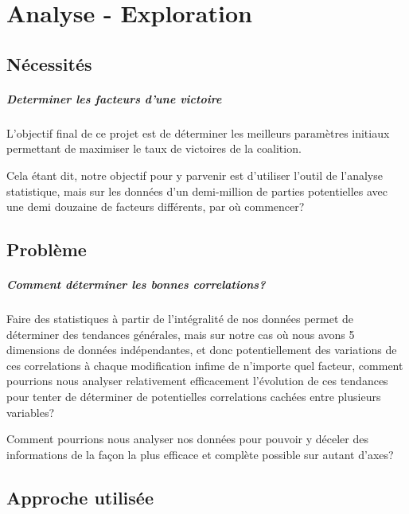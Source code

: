 \chapter{Analyse - Exploration}

	\section{Nécessités}
	
		\paragraph{Determiner les facteurs d'une victoire}
		L'objectif final de ce projet est de déterminer les meilleurs paramètres initiaux permettant de maximiser le taux de victoires de la coalition.
		
		Cela étant dit, notre objectif pour y parvenir est d'utiliser l'outil de l'analyse statistique, mais sur les données d'un demi-million de parties potentielles avec une demi douzaine de facteurs différents, par où commencer?
 
	
	\section{Problème}
		
		\paragraph{Comment déterminer les bonnes correlations?}
		Faire des statistiques à partir de l'intégralité de nos données permet de déterminer des tendances générales, mais sur notre cas où nous avons 5 dimensions de données indépendantes, et donc potentiellement des variations de ces correlations à chaque modification infime de n'importe quel facteur, comment pourrions nous analyser relativement efficacement l'évolution de ces tendances pour tenter de déterminer de potentielles correlations cachées entre plusieurs variables?
		
	
		\begin{problem}
			Comment pourrions nous analyser nos données pour pouvoir y déceler des informations de la façon la plus efficace et complète possible sur autant d'axes?
		\end{problem}
	
	\section{Approche utilisée}
	
